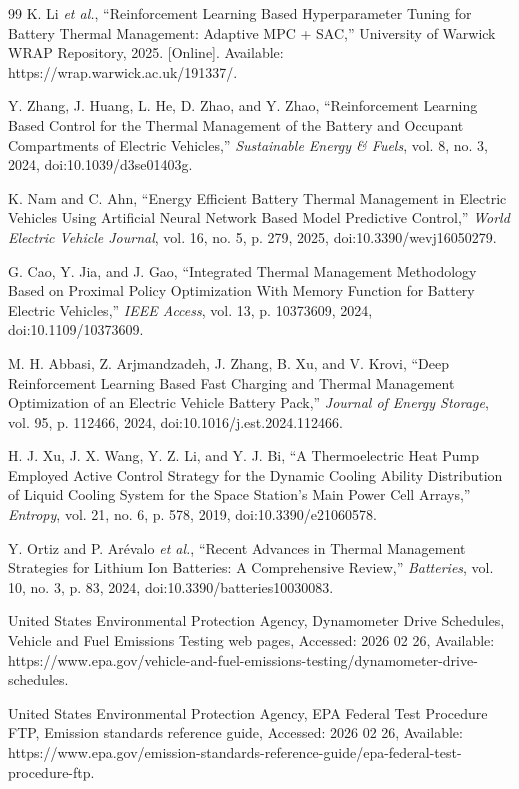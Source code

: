 \documentclass[twocolumn]{article}
\begin{document}
\begin{thebibliography}{99}
K. Li \textit{et al.}, ``Reinforcement Learning Based Hyperparameter Tuning for Battery Thermal Management: Adaptive MPC + SAC,'' University of Warwick WRAP Repository, 2025. [Online]. Available: https://wrap.warwick.ac.uk/191337/.

Y. Zhang, J. Huang, L. He, D. Zhao, and Y. Zhao, ``Reinforcement Learning Based Control for the Thermal Management of the Battery and Occupant Compartments of Electric Vehicles,'' \textit{Sustainable Energy \& Fuels}, vol. 8, no. 3, 2024, doi:10.1039/d3se01403g.

K. Nam and C. Ahn, ``Energy Efficient Battery Thermal Management in Electric Vehicles Using Artificial Neural Network Based Model Predictive Control,'' \textit{World Electric Vehicle Journal}, vol. 16, no. 5, p. 279, 2025, doi:10.3390/wevj16050279.

G. Cao, Y. Jia, and J. Gao, ``Integrated Thermal Management Methodology Based on Proximal Policy Optimization With Memory Function for Battery Electric Vehicles,'' \textit{IEEE Access}, vol. 13, p. 10373609, 2024, doi:10.1109/10373609.

M. H. Abbasi, Z. Arjmandzadeh, J. Zhang, B. Xu, and V. Krovi, ``Deep Reinforcement Learning Based Fast Charging and Thermal Management Optimization of an Electric Vehicle Battery Pack,'' \textit{Journal of Energy Storage}, vol. 95, p. 112466, 2024, doi:10.1016/j.est.2024.112466.

H. J. Xu, J. X. Wang, Y. Z. Li, and Y. J. Bi, ``A Thermoelectric Heat Pump Employed Active Control Strategy for the Dynamic Cooling Ability Distribution of Liquid Cooling System for the Space Station's Main Power Cell Arrays,'' \textit{Entropy}, vol. 21, no. 6, p. 578, 2019, doi:10.3390/e21060578.

Y. Ortiz and P. Ar{\'e}valo \textit{et al.}, ``Recent Advances in Thermal Management Strategies for Lithium Ion Batteries: A Comprehensive Review,'' \textit{Batteries}, vol. 10, no. 3, p. 83, 2024, doi:10.3390/batteries10030083.

United States Environmental Protection Agency,
Dynamometer Drive Schedules,
Vehicle and Fuel Emissions Testing web pages,
Accessed: 2026 02 26,
Available: https://www.epa.gov/vehicle-and-fuel-emissions-testing/dynamometer-drive-schedules.

United States Environmental Protection Agency,
EPA Federal Test Procedure FTP,
Emission standards reference guide,
Accessed: 2026 02 26,
Available: https://www.epa.gov/emission-standards-reference-guide/epa-federal-test-procedure-ftp.


\end{thebibliography}
\end{document}
